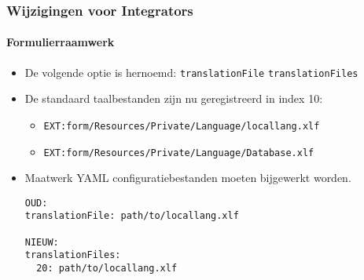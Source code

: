 \begin{frame}[fragile]
	\frametitle{Wijzigingen voor Integrators}
	\framesubtitle{Formulierraamwerk}

	\lstset{basicstyle=\tiny\ttfamily}

	\begin{itemize}
		\item De volgende optie is hernoemd:\newline
			\small\texttt{translationFile} \textrightarrow\hspace{0.1cm}\texttt{translationFiles}\normalsize
		\item De standaard taalbestanden zijn nu geregistreerd in index 10:

			\begin{itemize}
				\item \texttt{EXT:form/Resources/Private/Language/locallang.xlf}
				\item \texttt{EXT:form/Resources/Private/Language/Database.xlf}
			\end{itemize}

		\item Maatwerk YAML configuratiebestanden moeten bijgewerkt worden.

\begin{lstlisting}
OUD:
translationFile: path/to/locallang.xlf

NIEUW:
translationFiles:
  20: path/to/locallang.xlf
\end{lstlisting}

	\end{itemize}

\end{frame}


